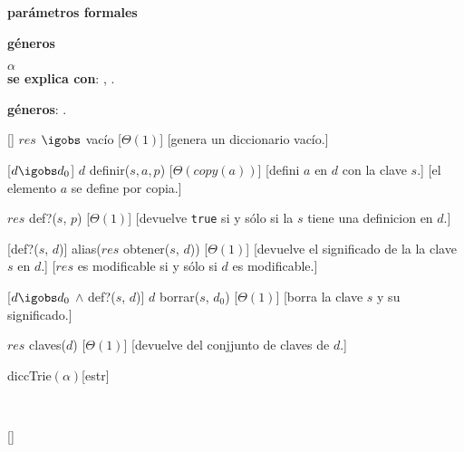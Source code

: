 
\begin{Interfaz}

  \textbf{parámetros formales}\parindent\\
  \parbox{1.7cm}{\textbf{géneros}} $\alpha$\\
 
 
  \textbf{se explica con}: , .

  \textbf{géneros}: .

  []%
  {$res$ $\igobs$ vac\'io}%
  [$\Theta(1)$]
  [genera un diccionario vac\'io.]

  [$d \igobs d_0$]
  {$d$ \igobs definir($s, a, p$)}
  [$\Theta(copy(a))$]
  [defini $a$ en $d$ con la clave $s$.]
  [el elemento $a$ se define por copia.]

  {$res$ \igobs def?($s$, $p$)}
  [$\Theta(1)$]
  [devuelve \texttt{true} si y sólo si la $s$ tiene una definicion en $d$.]

  [def?($s$, $d$)]
  {alias($res$ \igobs obtener($s$, $d$))}
  [$\Theta(1)$]
  [devuelve el significado de la la clave $s$ en $d$.]
  [$res$ es modificable si y sólo si $d$ es modificable.]

  [$d \igobs d_0$ $\land$ def?($s$, $d$)]
  {$d$ \igobs borrar($s$, $d_0$)}
  [$\Theta(1)$]
  [borra la clave $s$ y su significado.]

  {$res$ \igobs claves($d$)}
  [$\Theta(1)$]
  [devuelve del conjjunto de claves de $d$.]


\end{Interfaz}

\begin{Representacion}
  
  \begin{Estructura}{diccTrie$(\alpha)$}[estr]
    \begin{Tupla}[estr]
    \end{Tupla}

    \begin{Tupla}[nodo]
    \end{Tupla}
  \end{Estructura}




  ~

  \AbsFc[]{}[]{}

\end{Representacion}

\begin{Algoritmos}
  
\end{Algoritmos}

